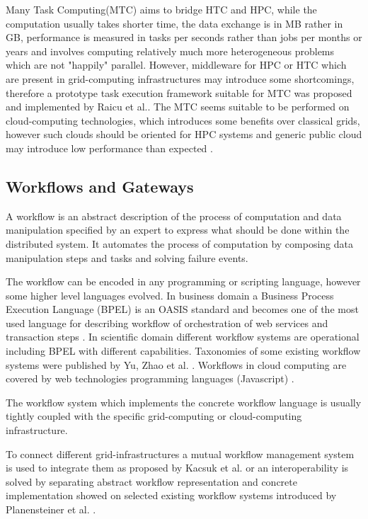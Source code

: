 Many Task Computing(MTC) aims to bridge HTC and HPC, while the computation usually takes shorter time, the data exchange is in MB rather in GB, performance is measured in tasks per seconds rather than jobs per months or years and involves computing relatively much more heterogeneous problems which are not "happily" parallel. However, middleware for HPC or HTC which are present in grid-computing infrastructures may introduce some shortcomings, therefore a prototype task execution framework suitable for MTC was proposed and implemented by Raicu et al.\cite{Raicu2008, Raicu2009,Raicu2010}.
The MTC seems suitable to be performed on cloud-computing technologies, which introduces some benefits over classical grids, however such clouds should be oriented for HPC systems and generic public cloud may introduce low performance than expected \cite{Iosup2010}.

\subsection{Workflows and Gateways}
\label{sec:introworkflow}
A workflow is an abstract description of the process of computation and data manipulation specified by an expert to express what should be done within the distributed system. It automates the process of computation by composing data manipulation steps and tasks and solving failure events.

The workflow can be encoded in any programming or scripting language, however some higher level languages evolved. In business domain a Business Process Execution Language (BPEL) is an OASIS standard and becomes one of the most used language for describing workflow of orchestration of web services and transaction steps \cite{Pasley2005}. In scientific domain different workflow systems are operational including BPEL with different capabilities. Taxonomies of some existing workflow systems were published by Yu, Zhao et al. \cite{Yu2005a,Zhao2008,Curcin2008}. Workflows in cloud computing are covered by web technologies programming languages (Javascript) \cite{Foster2008}.

The workflow system which implements the concrete workflow language is usually tightly coupled with the specific grid-computing or cloud-computing infrastructure. 

To connect different grid-infrastructures a mutual workflow management system is used to integrate them as proposed by Kacsuk et al. \cite{Kacsuk2008a,Kacsuk2011} or an interoperability is solved by separating abstract workflow representation and concrete implementation showed on selected existing workflow systems introduced by Planensteiner et al. \cite{Plankensteiner2013}.

